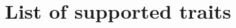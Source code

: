 \documentclass[acmsmall,review,anonymous]{acmart}\settopmatter{printfolios=true,printccs=false,printacmref=false}
\let\listinline\lstinline
\begin{document}
% 
% 

\section{List of supported traits}
\label{sec:traitslist}
\end{document}
